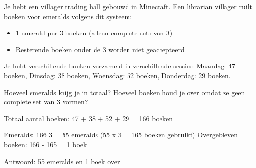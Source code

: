 \begin{opgave}
Je hebt een villager trading hall gebouwd in Minecraft. Een librarian villager
ruilt boeken voor emeralds volgens dit systeem:

\begin{itemize}
\item 1 emerald per 3 boeken (alleen complete sets van 3)
\item Resterende boeken onder de 3 worden niet geaccepteerd
\end{itemize}

Je hebt verschillende boeken verzameld in verschillende sessies:
Maandag: 47 boeken, Dinsdag: 38 boeken, Woensdag: 52 boeken, Donderdag: 29 boeken.

Hoeveel emeralds krijg je in totaal? Hoeveel boeken houd je over omdat ze geen
complete set van 3 vormen?
\end{opgave}

\begin{oplossing}
Totaal aantal boeken: 47 + 38 + 52 + 29 = 166 boeken

Emeralds: 166 \textrm{\textdiv} 3 = 55 emeralds (55 x 3 = 165 boeken gebruikt)
Overgebleven boeken: 166 - 165 = 1 boek

Antwoord: 55 emeralds en 1 boek over
\end{oplossing}